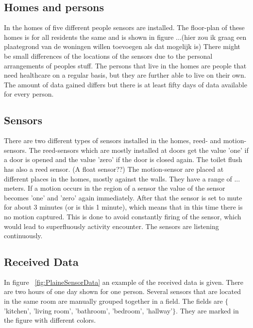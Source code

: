 \documentclass[11pt,a4paper]{article}
\begin{document}
\subsection{Homes and persons}
In the homes of five different people sensors are installed. The floor-plan of these homes is for all residents the same and is shown in figure ...(hier zou ik graag een plaategrond van de woningen willen toevoegen als dat mogelijk is) There might be small differences of the locations of the sensors due to the personal arrangements of peoples stuff.
The persons that live in the homes are people that need healthcare on a regular basis, but they are further able to live on their own. The amount of data gained differs but there is at least fifty days of data available for every person. 
\subsection{Sensors}
There are two different types of sensors installed in the homes, reed- and motion-sensors. The reed-sensors which are mostly installed at doors get the value 'one' if a door is opened and the value 'zero' if the door is closed again. The toilet flush has also a reed sensor. (A float sensor??)
The motion-sensor are placed at different places in the homes, mostly against the walls. They have a range of ... meters. If a motion occurs in the region of a sensor the value of the sensor becomes 'one' and 'zero' again immediately. After that the sensor is set to mute for about 3 minutes (or is this 1 minute), which means that in this time there is no motion captured. This is done to avoid constantly firing of the sensor, which would lead to superfluously activity encounter.
The sensors are listening continuously.

\subsection{Received Data}
In figure ~\ref{fig:PlaineSensorData} an example of the received data is given. There are two hours of one day shown for one person. Several sensors that are located in the same room are manually grouped together in a field. The fields are $\{$'kitchen', 'living room', 'bathroom', 'bedroom', 'hallway'$\}$. They are marked in the figure with different colors.
\end{document}
